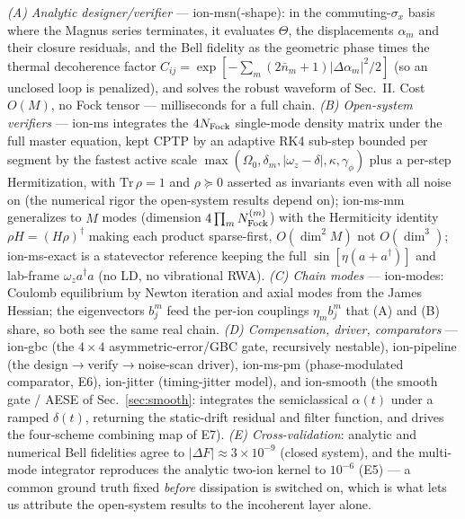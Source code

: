\documentclass[aps,prapplied,twocolumn,superscriptaddress,floatfix,nofootinbib]{revtex4-2}
\begin{document}
\emph{(A) Analytic designer/verifier} --- \textsf{ion-msn(-shape)}: in the commuting-$\sigma_x$
basis where the Magnus series terminates, it evaluates $\Theta$, the displacements $\alpha_m$ and
their closure residuals, and the Bell fidelity as the geometric phase times the thermal
decoherence factor $C_{ij}=\exp[-\sum_m(2\bar n_m{+}1)|\Delta\alpha_m|^2/2]$ (so an unclosed loop
is penalized), and solves the robust waveform of Sec.~II. Cost $O(M)$, no Fock tensor ---
milliseconds for a full chain. \emph{(B) Open-system verifiers} --- \textsf{ion-ms} integrates
the $4N_{\rm Fock}$ single-mode density matrix under the full master equation, kept CPTP by an
adaptive RK4 sub-step bounded per segment by the fastest active scale
$\max(\Omega_0,\delta_m,|\omega_z{-}\delta|,\kappa,\gamma_\phi)$ plus a per-step Hermitization, with
$\mathrm{Tr}\,\rho{=}1$ and $\rho\succeq0$ asserted as invariants even with all noise on (the
numerical rigor the open-system results depend on); \textsf{ion-ms-mm} generalizes to $M$ modes
(dimension $4\prod_m N_{\rm Fock}^{(m)}$) with the Hermiticity identity $\rho H=(H\rho)^\dagger$
making each product sparse-first, $O(\dim^2 M)$ not $O(\dim^3)$; \textsf{ion-ms-exact} is a
statevector reference keeping the full $\sin[\eta(a{+}a^\dagger)]$ and lab-frame $\omega_z
a^\dagger a$ (no LD, no vibrational RWA). \emph{(C) Chain modes} --- \textsf{ion-modes}: Coulomb
equilibrium by Newton iteration and axial modes from the James Hessian; the eigenvectors $b^m_j$
feed the per-ion couplings $\eta_m b^m_j$ that (A) and (B) share, so both see the same real chain.
\emph{(D) Compensation, driver, comparators} --- \textsf{ion-gbc} (the $4\times4$
asymmetric-error/GBC gate, recursively nestable), \textsf{ion-pipeline} (the design$\to$verify$\to$noise-scan
driver), \textsf{ion-ms-pm} (phase-modulated comparator, E6), \textsf{ion-jitter} (timing-jitter
model), and \textsf{ion-smooth} (the smooth gate / AESE of Sec.~\ref{sec:smooth}: integrates the
semiclassical $\alpha(t)$ under a ramped $\delta(t)$, returning the static-drift residual and filter
function, and drives the four-scheme combining map of E7). \emph{(E) Cross-validation}: analytic and numerical Bell fidelities agree to
$|\Delta F|\approx3\times10^{-9}$ (closed system), and the multi-mode integrator reproduces the
analytic two-ion kernel to $10^{-6}$ (E5) --- a common ground truth fixed \emph{before} dissipation
is switched on, which is what lets us attribute the open-system results to the incoherent layer
alone.
\end{document}
